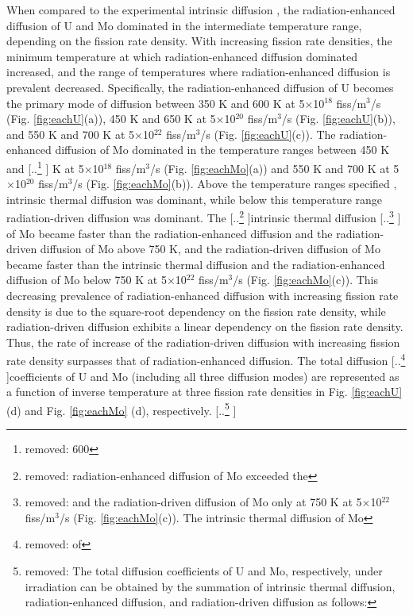 \documentclass[preprint,12pt]{elsarticle}
\providecommand{\DIFadd}[1]{{\protect\color{blue} \sf #1}} %
\providecommand{\DIFdel}[1]{{\protect\color{red} [..\footnote{removed: #1} ]}} %
\providecommand{\DIFaddbegin}{} %
\providecommand{\DIFaddend}{} %
\providecommand{\DIFdelbegin}{} %
\providecommand{\DIFdelend}{} %
\newcommand{\DIFscaledelfig}{0.5}
\newlength{\DIFdelgraphicswidth} %
\newlength{\DIFdelgraphicsheight} %
\newcommand{\DIFaddincludegraphics}[2][]{{\color{blue}\fbox{\DIFOincludegraphics[#1]{#2}}}} %
\newcommand{\DIFdelincludegraphics}[2][]{%
\sbox{\DIFdelgraphicsbox}{\DIFOincludegraphics[#1]{#2}}%
\settoboxwidth{\DIFdelgraphicswidth}{\DIFdelgraphicsbox} %
\settoboxtotalheight{\DIFdelgraphicsheight}{\DIFdelgraphicsbox} %
\scalebox{\DIFscaledelfig}{%
\parbox[b]{\DIFdelgraphicswidth}{\usebox{\DIFdelgraphicsbox}\\[-\baselineskip] \rule{\DIFdelgraphicswidth}{0em}}\llap{\resizebox{\DIFdelgraphicswidth}{\DIFdelgraphicsheight}{%
\setlength{\unitlength}{\DIFdelgraphicswidth}%
\begin{picture}(1,1)%
\thicklines\linethickness{2pt} %
{\color[rgb]{1,0,0}\put(0,0){\framebox(1,1){}}}%
{\color[rgb]{1,0,0}\put(0,0){\line( 1,1){1}}}%
{\color[rgb]{1,0,0}\put(0,1){\line(1,-1){1}}}%
\end{picture}%
}\hspace*{3pt}}} %
} %
\DeclareRobustCommand{\DIFaddbegin}{\DIFOaddbegin \let\includegraphics\DIFaddincludegraphics} %
\DeclareRobustCommand{\DIFaddend}{\DIFOaddend \let\includegraphics\DIFOincludegraphics} %
\DeclareRobustCommand{\DIFdelbegin}{\DIFOdelbegin \let\includegraphics\DIFdelincludegraphics} %
\DeclareRobustCommand{\DIFdelend}{\DIFOaddend \let\includegraphics\DIFOincludegraphics} %
\begin{document}
\DIFadd{When compared to the experimental intrinsic diffusion \cite{huang2013}, the radiation-enhanced diffusion of U and Mo }\DIFaddend dominated in the intermediate temperature range, depending on the fission rate density. With increasing fission rate densities, the minimum temperature at which radiation-enhanced diffusion dominated increased, and the range of temperatures where radiation-enhanced diffusion is prevalent decreased. Specifically, the radiation-enhanced diffusion of U becomes the primary mode of diffusion between 350 K and 600 K at 5$\times$10$^{18}$ fiss/m$^{3}$/s (Fig. \ref{fig:eachU}(a)), 450 K and 650 K at 5$\times$10$^{20}$ fiss/m$^{3}$/s (Fig. \ref{fig:eachU}(b)), and 550 K and 700 K at 5$\times$10$^{22}$ fiss/m$^{3}$/s (Fig. \ref{fig:eachU}(c)). The radiation-enhanced diffusion of Mo dominated in the temperature ranges between 450 K and \DIFdelbegin \DIFdel{600 }\DIFdelend \DIFaddbegin \DIFadd{650 }\DIFaddend K at 5$\times$10$^{18}$ fiss/m$^{3}$/s (Fig. \ref{fig:eachMo}(a)) and 550 K and 700 K at 5$\times$10$^{20}$ fiss/m$^{3}$/s (Fig. \ref{fig:eachMo}(b)). Above the temperature ranges specified\DIFaddbegin \DIFadd{, }\DIFaddend intrinsic thermal diffusion was dominant, while below this temperature range radiation-driven diffusion was dominant. The \DIFdelbegin \DIFdel{radiation-enhanced diffusion of Mo exceeded the }\DIFdelend intrinsic thermal diffusion \DIFdelbegin \DIFdel{and the radiation-driven diffusion of Mo only at 750 K at 5$\times$10$^{22}$ fiss/m$^{3}$/s (Fig. \ref{fig:eachMo}(c)). The intrinsic thermal diffusion of Mo }\DIFdelend \DIFaddbegin \DIFadd{of Mo }\DIFaddend became faster than the radiation-enhanced diffusion and the radiation-driven diffusion of Mo above 750 K, and the radiation-driven diffusion of Mo became faster than the intrinsic thermal diffusion and the radiation-enhanced diffusion of Mo below 750 K \DIFaddbegin \DIFadd{at 5$\times$10$^{22}$ fiss/m$^{3}$/s }\DIFaddend (Fig. \ref{fig:eachMo}(c)). This decreasing prevalence of radiation-enhanced diffusion with increasing fission rate density is due to the square-root dependency on the fission rate density, while radiation-driven diffusion exhibits a linear dependency on the fission rate density. Thus, the rate of increase of the radiation-driven diffusion with increasing fission rate density surpasses that of radiation-enhanced diffusion. The total diffusion \DIFdelbegin \DIFdel{of }\DIFdelend coefficients of U and Mo (including all three diffusion modes) are represented as a function of \DIFaddbegin \DIFadd{inverse }\DIFaddend temperature at three fission rate densities in Fig. \ref{fig:eachU} (d) and Fig. \ref{fig:eachMo} (d), respectively. 
\DIFdelbegin \DIFdel{The total diffusion coefficients of U and Mo, respectively, under irradiation can be obtained by the summation of intrinsic thermal diffusion, radiation-enhanced diffusion, and radiation-driven diffusion as follows: 
}\DIFdelend \DIFaddbegin \\
\DIFaddend 
\end{document}
